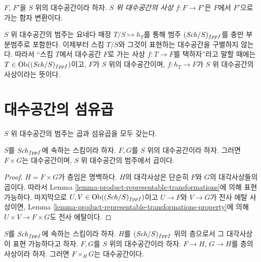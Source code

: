 \begin{definition}
\label{definition-morphism-algebraic-spaces}
$F$, $F'$을 $S$ 위의 대수공간이라 하자.
{\it $S$ 위 대수공간의 사상 $f : F \to F'$}은 $F$에서 $F'$으로 가는
함자 변환이다.
\end{definition}

\noindent
$S$ 위 대수공간의 범주는 요네다 매장 $T/S \mapsto h_T$를 통해
범주 $(\mathit{Sch}/S)_{fppf}$를 충만 부분범주로 포함한다. 이제부터
스킴 $T/S$와 그것이 표현하는 대수공간을 구별하지 않는다. 따라서
``스킴 $T$에서 대수공간 $F$로 가는 사상 $f : T \to F$를 택하자''라고
말할 때에는 $T \in \mathop{\mathrm{Ob}}\nolimits((\mathit{Sch}/S)_{fppf})$이고, $F$가 $S$ 위의
대수공간이며, $f : h_T \to F$가 $S$ 위 대수공간의 사상이라는 뜻이다.






\section{대수공간의 섬유곱}
\label{section-fibre-products}

\noindent
$S$ 위 대수공간의 범주는 곱과 섬유곱을 모두 갖는다.

\begin{lemma}
\label{lemma-product-spaces}
$S$를 $\mathit{Sch}_{fppf}$에 속하는 스킴이라 하자.
$F, G$를 $S$ 위의 대수공간이라 하자.
그러면 $F \times G$는 대수공간이며, $S$ 위 대수공간의 범주에서
곱이다.
\end{lemma}

\begin{proof}
$H = F \times G$가 층임은 명백하다.
$H$의 대각사상은 단순히 $F$와 $G$의 대각사상들의 곱이다.
따라서 Lemma \ref{lemma-product-representable-transformations}에 의해
표현 가능하다. 마지막으로 $U, V \in \mathop{\mathrm{Ob}}\nolimits((\mathit{Sch}/S)_{fppf})$이고
$U \to F$와 $V \to G$가 전사 에탈 사상이면, Lemma
\ref{lemma-product-representable-transformations-property}에 의해
$U \times V \to F \times G$도 전사 에탈이다.
\end{proof}

\begin{lemma}
\label{lemma-fibre-product-spaces-over-sheaf-with-representable-diagonal}
$S$를 $\mathit{Sch}_{fppf}$에 속하는 스킴이라 하자.
$H$를 $(\mathit{Sch}/S)_{fppf}$ 위의 층으로서 그 대각사상이 표현 가능하다고
하자. $F, G$를 $S$ 위의 대수공간이라 하자.
$F \to H$, $G \to H$를 층의 사상이라 하자.
그러면 $F \times_H G$는 대수공간이다.
\end{lemma}

